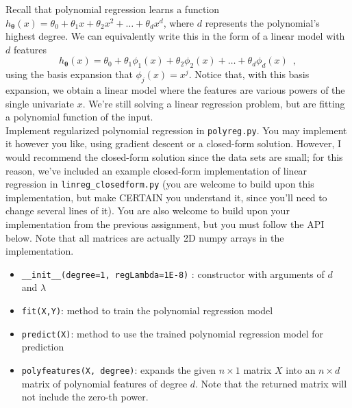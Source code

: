 \documentclass{article}
\begin{document}
\begin{aprob}
     Recall that polynomial regression learns a function $h_{\bm{\theta}}(x) = \theta_0 + \theta_1 x + \theta_2 x^2 + \ldots + \theta_d x^d$, where $d$ represents the polynomial's highest degree.  We can equivalently write this in the form of a  linear model with $d$ features
    \begin{equation}
        h_{\bm{\theta}}(x) = \theta_0 + \theta_1 \phi_1(x)  + \theta_2 \phi_2(x)  + \ldots + \theta_d \phi_d(x)  \enspace ,
    \end{equation}
    using the basis expansion that $\phi_j(x) = x^j$.  Notice that, with this basis expansion, we obtain a linear model where the features are various powers of the single univariate $x$.  We're still solving a linear regression problem, but are fitting a polynomial function of the input.\\
    
    Implement regularized polynomial regression in \texttt{polyreg.py}.  You may implement it however you like, using gradient descent or a closed-form solution.  However, I would recommend the closed-form solution since the data sets are small; for this reason, we've included an example closed-form implementation of linear regression in \texttt{linreg\_closedform.py} (you are welcome to build upon this implementation, but make CERTAIN you understand it, since you'll need to change several lines of it).  You are also welcome to build upon your implementation from the previous assignment, but you must follow the API below.  Note that all matrices are actually 2D numpy arrays in the implementation.\\
    
    \begin{itemize}[noitemsep, nolistsep]
        \item \texttt{\_\_init\_\_(degree=1, regLambda=1E-8)} : constructor with arguments of $d$ and $\lambda$
        \item \texttt{fit(X,Y)}: method to train the polynomial regression model
        \item \texttt{predict(X)}: method to use the trained polynomial regression model for prediction
        \item \texttt{polyfeatures(X, degree)}: expands the given $n \times 1$ matrix $X$ into an $n \times d$ matrix of polynomial features of degree $d$.  Note that the returned matrix will not include the zero-th power.\\
    \end{itemize}
    

\end{aprob}
\end{document}

